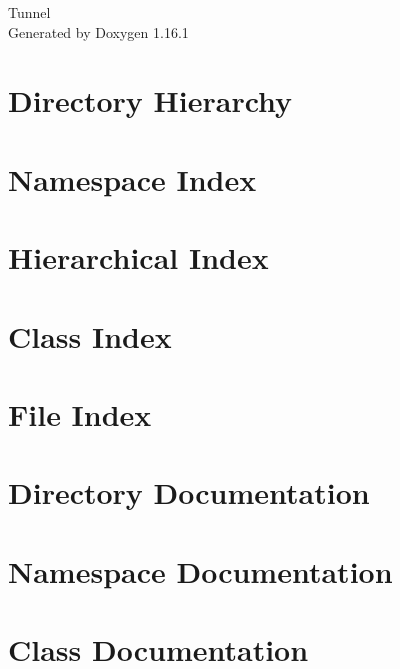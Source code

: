\documentclass[twoside]{book}
\newcommand{\+}{\discretionary{\mbox{\scriptsize$\hookleftarrow$}}{}{}}
\newcommand{\clearemptydoublepage}{%
    \newpage{\pagestyle{empty}\cleardoublepage}%
  }
\begin{document}
  \raggedbottom
    \hypersetup{pageanchor=false,
                bookmarksnumbered=true,
                pdfencoding=unicode
               }
  \begin{titlepage}
  \vspace*{7cm}
  \begin{center}%
  {\Large Tunnel}\\
  \vspace*{1cm}
  {\large Generated by Doxygen 1.16.1}\\
  \end{center}
  \end{titlepage}
  \clearemptydoublepage
  \tableofcontents
  \clearemptydoublepage
  \hypersetup{pageanchor=true}
\chapter{Directory Hierarchy}

\chapter{Namespace Index}

\chapter{Hierarchical Index}

\chapter{Class Index}

\chapter{File Index}

\chapter{Directory Documentation}




\chapter{Namespace Documentation}

\chapter{Class Documentation}





\end{document}
